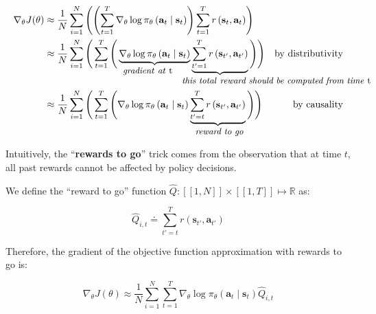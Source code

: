 \documentclass{article}
\begin{document}
\begin{subequations}
  \begin{align}
    \nabla_\theta J(\theta) 
        &\approx \frac{1}{N} \sum_{i=1}^N\left(\left(\sum_{t=1}^T\nabla_\theta\log\pi_\theta\left(\mathbf{a}_t\mid \mathbf{s}_t\right)\right) \sum_{t=1}^T r\left(\mathbf{s}_t,\mathbf{a}_t\right)\right)\\
        &\approx \frac{1}{N} \sum_{i=1}^N\Bigg(\sum_{t=1}^T\Bigg(\underbrace{\nabla_\theta\log\pi_\theta\left(\mathbf{a}_t\mid \mathbf{s}_t\right)}_{\small\llap{\textit{gradient}}\rlap{\textit{ at }t}} \underbrace{\sum_{t'=1}^T r\left(\mathbf{s}_{t'},\mathbf{a}_{t'}\right)}_{\small\llap{\textit{this total }}\rlap{\textit{reward should be computed from time }t}}\Bigg)\Bigg) &\text{by distributivity}\\
        &\approx \frac{1}{N} \sum_{i=1}^N\Bigg(\sum_{t=1}^T\Bigg(\nabla_\theta\log\pi_\theta\left(\mathbf{a}_t\mid \mathbf{s}_t\right) \underbrace{\sum_{t'=t}^T r\left(\mathbf{s}_{t'},\mathbf{a}_{t'}\right)}_{\textit{\small reward to go}}\Bigg)\Bigg) &\text{by causality}
  \end{align}
\end{subequations}

Intuitively, the ``\textbf{rewards to go}'' trick comes from the observation that at time $t$, all past rewards cannot be affected by policy decisions.

We define the ``reward to go'' function $\hat{Q}: \left[\!\left[1,N\right]\!\right] \times \left[\!\left[1,T\right]\!\right] \mapsto \mathbb{R}$ as:

\begin{equation}
  \hat{Q}_{i,t} \doteq \sum_{t'=t}^T r\left(\mathbf{s}_{t'},\mathbf{a}_{t'}\right)
\end{equation}

Therefore, the gradient of the objective function approximation with rewards to go is:

\begin{equation}
  \nabla_\theta J(\theta) \approx \frac{1}{N} \sum_{i=1}^N\sum_{t=1}^T\nabla_\theta\log\pi_\theta\left(\mathbf{a}_t\mid \mathbf{s}_t\right) \hat{Q}_{i,t}
\end{equation}



\small


\end{document}
